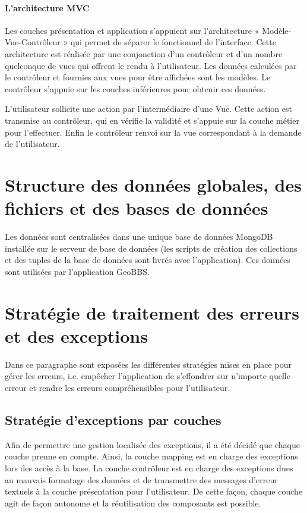 \documentclass[a4paper,12pt]{report}
\begin{document}
\begin{onehalfspace}
\subsubsection{L'architecture MVC} %
\label{ssub:l_architecture_mvc}
Les couches présentation et application s’appuient  sur l’architecture « Modèle-Vue-Contrôleur » qui permet de séparer le fonctionnel de l’interface. Cette architecture est réalisée par une conjonction d’un contrôleur et d’un nombre quelconque de vues qui offrent le rendu à l’utilisateur. Les données calculées par le contrôleur et fournies aux vues pour être affichées sont les modèles. Le contrôleur s’appuie  sur les couches inférieures pour obtenir ces données.

L'utilisateur sollicite une action par l’intermédiaire d’une Vue. Cette action est transmise au contrôleur, qui en vérifie la validité et s’appuie sur la couche métier pour l’effectuer. Enfin le contrôleur renvoi sur la vue correspondant à la demande de l’utilisateur.

\chapter{Structure des données globales, des fichiers et des bases de données} %
  Les données sont centralisées dans une unique base de données MongoDB installée sur le serveur de base de données (les scripts de création des collections et des tuples de la base de données sont livrés avec l’application). Ces données sont utilisées par l’application GeoBBS.

\chapter{Stratégie de traitement des erreurs et des exceptions}
  Dans ce paragraphe sont exposées les différentes stratégies mises en place pour gérer les erreurs, i.e. empêcher l’application de s’effondrer sur n’importe quelle erreur et rendre les erreurs compréhensibles pour l’utilisateur.

\section{Stratégie d’exceptions par couches}
  Afin de permettre une gestion localisée des exceptions, il a été décidé que chaque couche prenne en compte. Ainsi, la couche mapping est en charge des exceptions lors des accès à la base. La couche contrôleur est en charge des exceptions dues au mauvais formatage des données et de transmettre des messages d’erreur textuels à la couche présentation pour l’utilisateur. De cette façon, chaque couche agit de façon autonome et la réutilisation des composants est possible.


\end{onehalfspace}
\end{document}
